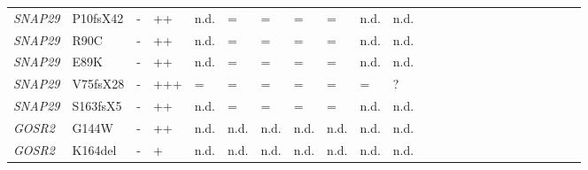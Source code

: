 \begin{landscape}
\begin{longtable}[c]{C{1.2cm}C{2cm}C{0.5cm}C{1.5cm}C{1.5cm}C{0.5cm}C{0.5cm}C{0.5cm}C{0.5cm}C{1.5cm}C{1.5cm}C{1.5cm}c c c c c c c c c c c c}
        \emph{SNAP29} & P10fsX42 & -                       & ++                                      & n.d.                                 & =   & = & =   & =  & n.d.                                  & n.d.                      & \cite{mcdonald-mcginn_hemizygous_2013} \\
        \emph{SNAP29} & R90C & -                       & ++                                      & n.d.                                 & =   & = & =   & =  & n.d.                                  & n.d.                      & \cite{mcdonald-mcginn_hemizygous_2013} \\
        \emph{SNAP29} & E89K & -                       & ++                                      & n.d.                                 & =   & = & =   & =  & n.d.                                  & n.d.                      & \cite{mcdonald-mcginn_hemizygous_2013,zhang_genetic_2009} \\
        \emph{SNAP29} & V75fsX28 & -                       & +++                                      & =                                 & =   & = & =   & =  & =                                  & ?                      & \cite{sprecher_mutation_2005} \\
        \emph{SNAP29} & S163fsX5 & -                       & ++                                      & n.d.                                 & =   & = & =   & =  & n.d.                                  & n.d.                      & \cite{fuchstelem_cednik_2011} \\
        \emph{GOSR2} & G144W & -                       & ++                                      & n.d.                                 & n.d.   & n.d. & n.d.   & n.d.  & n.d.                                  & n.d.                      & \cite{praschberger_expanding_2015,corbett_mutation_2011} \\
        \emph{GOSR2} & K164del & -                       & +                                      & n.d.                                 & n.d.   & n.d. & n.d.   & n.d.  & n.d.                                  & n.d.                      & \cite{praschberger_expanding_2015} \\

\end{longtable}
\end{landscape}
